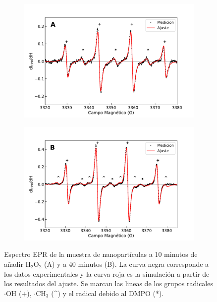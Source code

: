 \documentclass[aps,prl,reprint,superscriptaddress,showkeys]{revtex4-2}
\begin{document}
\begin{figure}[ht]
    \centering
    
    \begin{subfigure}
      \centering
      \includegraphics[width=0.95\linewidth]{ajuste_un_radical_lorentzian_10min.pdf}
    \end{subfigure}
    
    \vspace{0.1cm} %
    
    \begin{subfigure}
      \centering
      \includegraphics[width=0.95\linewidth]{ajuste_dos_radicales_lorentzian_40min.pdf}
      \label{fig:espectro}
    \end{subfigure}
    
    \caption{\centering Espectro EPR de la muestra de nanopartículas a 10 minutos de añadir H$_2$O$_2$ (A) y a 40 minutos (B). La curva negra corresponde a los datos experimentales y la curva roja es la simulación a partir de los resultados del ajuste. Se marcan las lineas de los grupos radicales $\cdot$OH ($+$), $\cdot$CH$_3$ (\^{}) y el radical debido al DMPO (*).}
  \end{figure}
\end{document}
